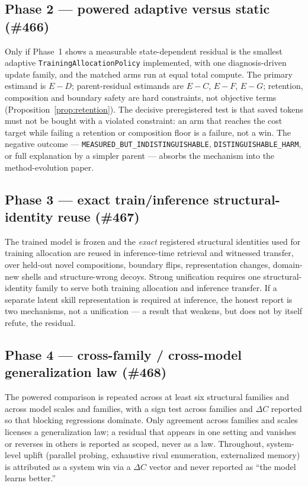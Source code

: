 \documentclass[11pt]{article}
\newcommand{\code}[1]{\texttt{#1}}
\begin{document}
\subsection{Phase 2 --- powered adaptive versus static (\#466)}
Only if Phase~1 shows a measurable state-dependent residual is the smallest adaptive \code{TrainingAllocationPolicy} implemented, with one diagnosis-driven update family, and the matched arms run at equal total compute. The primary estimand is $E-D$; parent-residual estimands are $E-C$, $E-F$, $E-G$; retention, composition and boundary safety are hard constraints, not objective terms (Proposition~\ref{prop:retention}). The decisive preregistered test is that saved tokens must not be bought with a violated constraint: an arm that reaches the cost target while failing a retention or composition floor is a failure, not a win. The negative outcome --- \code{MEASURED\_BUT\_INDISTINGUISHABLE}, \code{DISTINGUISHABLE\_HARM}, or full explanation by a simpler parent --- absorbs the mechanism into the method-evolution paper.

\subsection{Phase 3 --- exact train/inference structural-identity reuse (\#467)}
The trained model is frozen and the \emph{exact} registered structural identities used for training allocation are reused in inference-time retrieval and witnessed transfer, over held-out novel compositions, boundary flips, representation changes, domain-new shells and structure-wrong decoys. Strong unification requires one structural-identity family to serve both training allocation and inference transfer. If a separate latent skill representation is required at inference, the honest report is two mechanisms, not a unification --- a result that weakens, but does not by itself refute, the residual.

\subsection{Phase 4 --- cross-family / cross-model generalization law (\#468)}
The powered comparison is repeated across at least six structural families and across model scales and families, with a sign test across families and $\Delta C$ reported so that blocking regressions dominate. Only agreement across families and scales licenses a generalization law; a residual that appears in one setting and vanishes or reverses in others is reported as scoped, never as a law. Throughout, system-level uplift (parallel probing, exhaustive rival enumeration, externalized memory) is attributed as a system win via a $\Delta C$ vector and never reported as ``the model learns better.''
\end{document}

